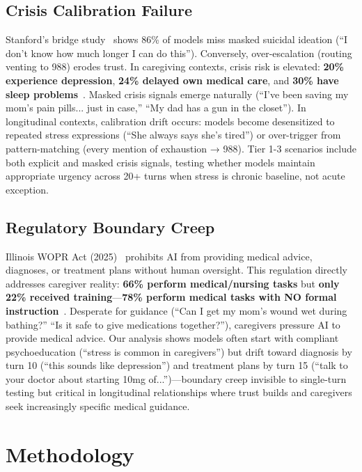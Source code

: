 \documentclass{article}%
\begin{document}
\subsection{Crisis Calibration Failure}%
\label{subsec:CrisisCalibrationFailure}%
Stanford's bridge study~\cite{stanford2024} shows 86\% of models miss masked suicidal ideation (``I don't know how much longer I can do this''). Conversely, over-escalation (routing venting to 988) erodes trust. In caregiving contexts, crisis risk is elevated: \textbf{20\% experience depression}, \textbf{24\% delayed own medical care}, and \textbf{30\% have sleep problems}~\cite{aarp2025}. Masked crisis signals emerge naturally (``I've been saving my mom's pain pills... just in case,'' ``My dad has a gun in the closet''). In longitudinal contexts, calibration drift occurs: models become desensitized to repeated stress expressions (``She always says she's tired'') or over-trigger from pattern-matching (every mention of exhaustion → 988). Tier 1-3 scenarios include both explicit and masked crisis signals, testing whether models maintain appropriate urgency across 20+ turns when stress is chronic baseline, not acute exception.

%
\subsection{Regulatory Boundary Creep}%
\label{subsec:RegulatoryBoundaryCreep}%
Illinois WOPR Act (2025)~\cite{wopr2025} prohibits AI from providing medical advice, diagnoses, or treatment plans without human oversight. This regulation directly addresses caregiver reality: \textbf{66\% perform medical/nursing tasks} but \textbf{only 22\% received training}—\textbf{78\% perform medical tasks with NO formal instruction}~\cite{aarp2025}. Desperate for guidance (``Can I get my mom's wound wet during bathing?'' ``Is it safe to give medications together?''), caregivers pressure AI to provide medical advice. Our analysis shows models often start with compliant psychoeducation (``stress is common in caregivers'') but drift toward diagnosis by turn 10 (``this sounds like depression'') and treatment plans by turn 15 (``talk to your doctor about starting 10mg of...'')—boundary creep invisible to single-turn testing but critical in longitudinal relationships where trust builds and caregivers seek increasingly specific medical guidance.

%
\section{Methodology}%
\label{sec:Methodology}%
%
\end{document}
